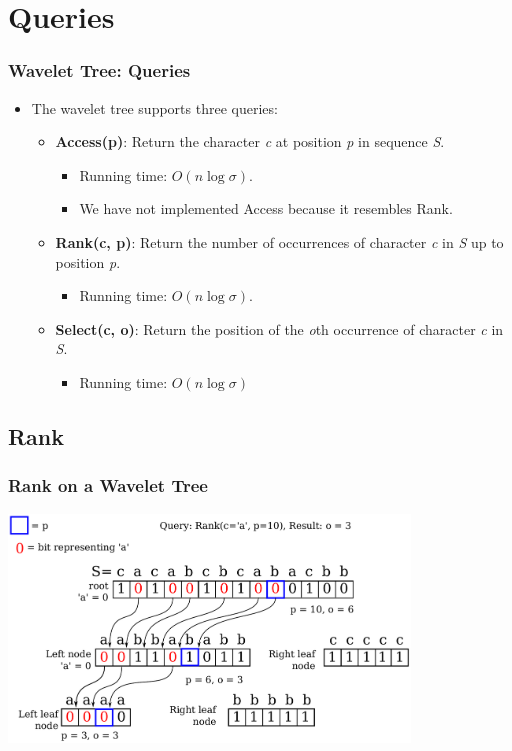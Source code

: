 \documentclass{beamer}
\begin{document}
\section{Queries}
\begin{frame}
\frametitle{Wavelet Tree: Queries}
\begin{itemize}
\item The wavelet tree supports three queries:
	\begin{itemize}
	\item \textbf{Access(p)}: Return the character \textit{c} at position \textit{p} in sequence \textit{S}.
		\begin{itemize}
		\item Running time: $O(n \log \sigma)$.
		\item We have not implemented Access because it resembles Rank.
		\end{itemize}
	\item \textbf{Rank(c, p)}: Return the number of occurrences of character \textit{c} in \textit{S} up to position \textit{p}.
		\begin{itemize}
		\item Running time: $O(n \log \sigma)$.
		\end{itemize}
	\item \textbf{Select(c, o)}: Return the position of the \textit{o}th occurrence of character \textit{c} in \textit{S}.
		\begin{itemize}
		\item Running time: $O(n \log \sigma)$
		\end{itemize}
	\end{itemize}
\end{itemize}

\end{frame}


\subsection{Rank}
\begin{frame}
\frametitle{Rank on a Wavelet Tree}
\begin{center}
	\center \includegraphics[width=0.8\textwidth]{RankDrawing}
\end{center}
\end{frame}
\end{document}
